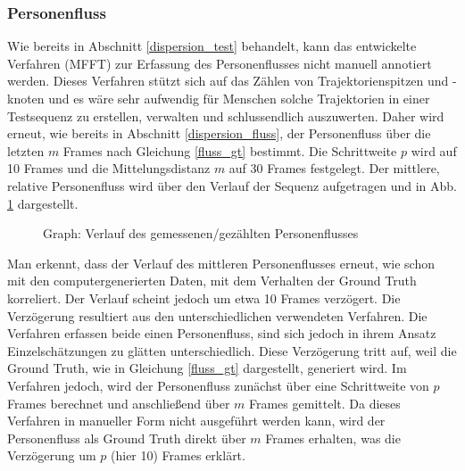 \subsubsection{Personenfluss}
Wie bereits in Abschnitt \ref{dispersion_test} behandelt, kann das entwickelte Verfahren (MFFT) zur Erfassung des Personenflusses nicht manuell annotiert werden. Dieses Verfahren stützt sich auf das Zählen von Trajektorienspitzen und -knoten und es wäre sehr aufwendig für Menschen solche Trajektorien in einer Testsequenz zu erstellen, verwalten und schlussendlich auszuwerten. Daher wird erneut, wie bereits in Abschnitt \ref{dispersion_fluss}, der Personenfluss über die letzten $m$ Frames nach Gleichung \ref{fluss_gt} bestimmt. Die Schrittweite $p$ wird auf 10 Frames und die Mittelungsdistanz $m$ auf 30 Frames festgelegt. Der mittlere, relative Personenfluss wird über den Verlauf der Sequenz aufgetragen und in Abb. \ref{business:fluss} dargestellt.
\vskip 10pt
\begin{figure}[h]
  \centering
  \caption{Graph: Verlauf des gemessenen/gezählten Personenflusses \cite{AliS07}}
  \label{business:fluss}
\end{figure}
\newpage
Man erkennt, dass der Verlauf des mittleren Personenflusses erneut, wie schon mit den computergenerierten Daten, mit dem Verhalten der Ground Truth korreliert. Der Verlauf scheint jedoch um etwa 10 Frames verzögert. Die Verzögerung resultiert aus den unterschiedlichen verwendeten Verfahren. Die Verfahren erfassen beide einen Personenfluss, sind sich jedoch in ihrem Ansatz Einzelschätzungen zu glätten unterschiedlich. Diese Verzögerung tritt auf, weil die Ground Truth, wie in Gleichung \ref{fluss_gt} dargestellt, generiert wird. Im Verfahren jedoch, wird der Personenfluss zunächst über eine Schrittweite von $p$ Frames berechnet und anschließend über $m$ Frames gemittelt. Da dieses Verfahren in manueller Form nicht ausgeführt werden kann, wird der Personenfluss als Ground Truth direkt über $m$ Frames erhalten, was die Verzögerung um $p$ (hier 10) Frames erklärt.

